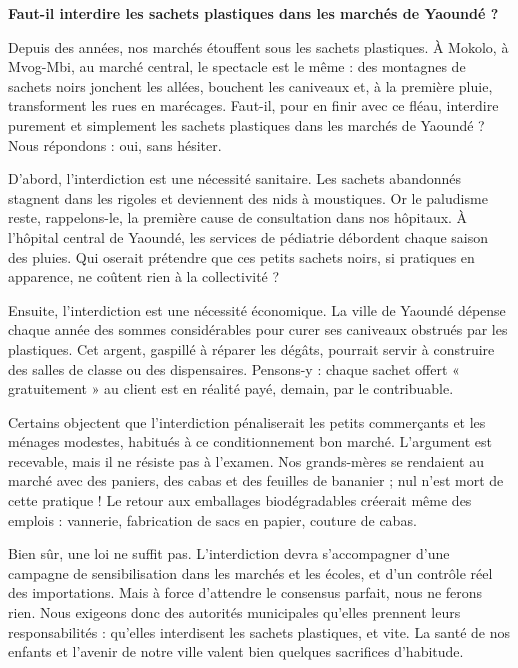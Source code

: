 \documentclass[11pt]{article}
\begin{document}
\begin{exemplebox}
\textbf{Faut-il interdire les sachets plastiques dans les marchés de Yaoundé ?}

Depuis des années, nos marchés étouffent sous les sachets plastiques. À Mokolo, à Mvog-Mbi, au marché central, le spectacle est le même : des montagnes de sachets noirs jonchent les allées, bouchent les caniveaux et, à la première pluie, transforment les rues en marécages. Faut-il, pour en finir avec ce fléau, interdire purement et simplement les sachets plastiques dans les marchés de Yaoundé ? Nous répondons : oui, sans hésiter.

D'abord, l'interdiction est une nécessité sanitaire. Les sachets abandonnés stagnent dans les rigoles et deviennent des nids à moustiques. Or le paludisme reste, rappelons-le, la première cause de consultation dans nos hôpitaux. À l'hôpital central de Yaoundé, les services de pédiatrie débordent chaque saison des pluies. Qui oserait prétendre que ces petits sachets noirs, si pratiques en apparence, ne coûtent rien à la collectivité ?

Ensuite, l'interdiction est une nécessité économique. La ville de Yaoundé dépense chaque année des sommes considérables pour curer ses caniveaux obstrués par les plastiques. Cet argent, gaspillé à réparer les dégâts, pourrait servir à construire des salles de classe ou des dispensaires. Pensons-y : chaque sachet offert « gratuitement » au client est en réalité payé, demain, par le contribuable.

Certains objectent que l'interdiction pénaliserait les petits commerçants et les ménages modestes, habitués à ce conditionnement bon marché. L'argument est recevable, mais il ne résiste pas à l'examen. Nos grands-mères se rendaient au marché avec des paniers, des cabas et des feuilles de bananier ; nul n'est mort de cette pratique ! Le retour aux emballages biodégradables créerait même des emplois : vannerie, fabrication de sacs en papier, couture de cabas.

Bien sûr, une loi ne suffit pas. L'interdiction devra s'accompagner d'une campagne de sensibilisation dans les marchés et les écoles, et d'un contrôle réel des importations. Mais à force d'attendre le consensus parfait, nous ne ferons rien. Nous exigeons donc des autorités municipales qu'elles prennent leurs responsabilités : qu'elles interdisent les sachets plastiques, et vite. La santé de nos enfants et l'avenir de notre ville valent bien quelques sacrifices d'habitude.
\end{exemplebox}
\end{document}
